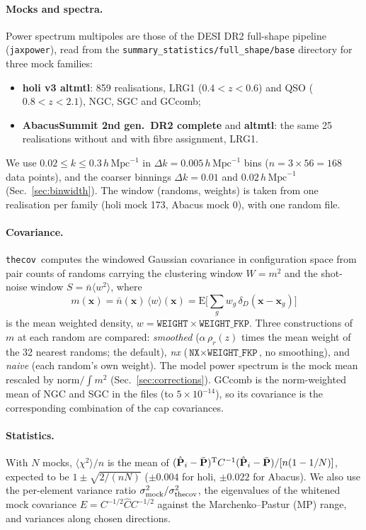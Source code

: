 \documentclass[11pt]{article}
\newcommand{\thecov}{\texttt{thecov}}
\newcommand{\hk}{\,h\,\mathrm{Mpc}^{-1}}
\newcommand{\Chat}{\hat{C}}
\begin{document}
\paragraph{Mocks and spectra.} Power spectrum multipoles are those of the DESI DR2 full-shape pipeline (\texttt{jaxpower}), read from the \texttt{summary\_statistics/full\_shape/base} directory for three mock families:
\begin{itemize}
\item \textbf{holi v3 altmtl}: 859 realisations, LRG1 ($0.4<z<0.6$) and QSO ($0.8<z<2.1$), NGC, SGC and GCcomb;
\item \textbf{AbacusSummit 2nd gen.\ DR2 complete} and \textbf{altmtl}: the same 25 realisations without and with fibre assignment, LRG1.
\end{itemize}
We use $0.02\le k\le0.3\hk$ in $\Delta k=0.005\hk$ bins ($n=3\times56=168$ data points), and the coarser binnings $\Delta k=0.01$ and $0.02\hk$ (Sec.~\ref{sec:binwidth}). The window (randoms, weights) is taken from one realisation per family (holi mock 173, Abacus mock 0), with one random file.

\paragraph{Covariance.} \thecov\ computes the windowed Gaussian covariance in configuration space from pair counts of randoms carrying the clustering window $W=m^2$ and the shot-noise window $S=\bar n\langle w^2\rangle$, where
\begin{equation}
m(\mathbf{x}) = \bar n(\mathbf{x})\,\langle w\rangle(\mathbf{x}) = \mathrm{E}\Big[\textstyle\sum_g w_g\,\delta_D(\mathbf{x}-\mathbf{x}_g)\Big]
\end{equation}
is the mean weighted density, $w=\texttt{WEIGHT}\times\texttt{WEIGHT\_FKP}$. Three constructions of $m$ at each random are compared: \emph{smoothed} ($\alpha\,\rho_r(z)$ times the mean weight of the 32 nearest randoms; the default), \emph{nx} ($\texttt{NX}\times\texttt{WEIGHT\_FKP}$, no smoothing), and \emph{naive} (each random's own weight). The model power spectrum is the mock mean rescaled by $\mathrm{norm}/\!\int m^2$ (Sec.~\ref{sec:corrections}). GCcomb is the norm-weighted mean of NGC and SGC in the files (to $5\times10^{-14}$), so its covariance is the corresponding combination of the cap covariances.

\paragraph{Statistics.} With $N$ mocks, $\langle\chi^2\rangle/n$ is the mean of $(\hat{\mathbf P}_i-\bar{\mathbf P})^{\rm T}C^{-1}(\hat{\mathbf P}_i-\bar{\mathbf P})/[n(1-1/N)]$, expected to be $1\pm\sqrt{2/(nN)}$ ($\pm0.004$ for holi, $\pm0.022$ for Abacus). We also use the per-element variance ratio $\sigma^2_{\rm mock}/\sigma^2_{\rm thecov}$, the eigenvalues of the whitened mock covariance $E=C^{-1/2}\Chat C^{-1/2}$ against the Marchenko--Pastur (MP) range, and variances along chosen directions.
\end{document}
